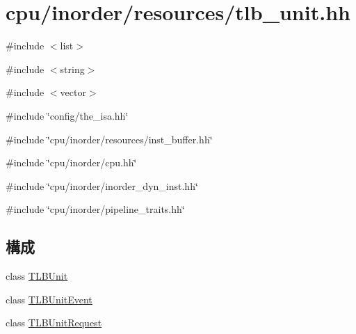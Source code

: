 \hypertarget{tlb__unit_8hh}{
\section{cpu/inorder/resources/tlb\_\-unit.hh}
\label{tlb__unit_8hh}
}
{\ttfamily \#include $<$list$>$}\par
{\ttfamily \#include $<$string$>$}\par
{\ttfamily \#include $<$vector$>$}\par
{\ttfamily \#include \char`\"{}config/the\_\-isa.hh\char`\"{}}\par
{\ttfamily \#include \char`\"{}cpu/inorder/resources/inst\_\-buffer.hh\char`\"{}}\par
{\ttfamily \#include \char`\"{}cpu/inorder/cpu.hh\char`\"{}}\par
{\ttfamily \#include \char`\"{}cpu/inorder/inorder\_\-dyn\_\-inst.hh\char`\"{}}\par
{\ttfamily \#include \char`\"{}cpu/inorder/pipeline\_\-traits.hh\char`\"{}}\par
\subsection*{構成}
\begin{DoxyCompactItemize}
\item 
class \hyperlink{classTLBUnit}{TLBUnit}
\item 
class \hyperlink{classTLBUnitEvent}{TLBUnitEvent}
\item 
class \hyperlink{classTLBUnitRequest}{TLBUnitRequest}
\end{DoxyCompactItemize}
